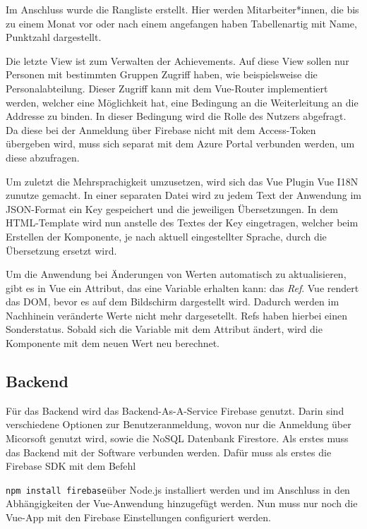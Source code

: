 \documentclass[12pt]{article}
\begin{document}
Im Anschluss wurde die Rangliste erstellt. Hier werden Mitarbeiter*innen, die bis zu einem Monat vor oder
nach einem angefangen haben Tabellenartig mit Name, Punktzahl dargestellt. %

Die letzte View ist zum Verwalten der Achievements. Auf diese View sollen nur Personen
mit bestimmten Gruppen Zugriff haben, wie beispielsweise die Personalabteilung. Dieser Zugriff
kann mit dem Vue-Router implementiert werden, welcher eine Möglichkeit hat, eine Bedingung
an die Weiterleitung an die Addresse zu binden. In dieser Bedingung wird die Rolle des
Nutzers abgefragt. Da diese bei der Anmeldung über Firebase nicht mit dem Access-Token
übergeben wird, muss sich separat mit dem Azure Portal verbunden werden, um diese abzufragen.

Um zuletzt die Mehrsprachigkeit umzusetzen, wird sich das Vue Plugin Vue I18N zunutze gemacht.
In einer separaten Datei wird zu jedem Text der Anwendung im JSON-Format ein Key gespeichert und
die jeweiligen Übersetzungen. In dem HTML-Template wird nun anstelle des Textes der Key eingetragen,
welcher beim Erstellen der Komponente, je nach aktuell eingestellter Sprache, durch die Übersetzung
ersetzt wird.

Um die Anwendung bei Änderungen von Werten automatisch zu aktualisieren, gibt es in Vue ein Attribut, das eine
Variable erhalten kann: das \textit{Ref}. Vue rendert das DOM, bevor es auf dem Bildschirm dargestellt wird.
Dadurch werden im Nachhinein veränderte Werte nicht mehr dargesetellt. Refs haben hierbei einen Sonderstatus.
Sobald sich die Variable mit dem Attribut ändert, wird die Komponente mit dem neuen Wert neu berechnet.



\subsection{Backend}

Für das Backend wird das Backend-As-A-Service Firebase genutzt. Darin sind verschiedene Optionen zur Benutzeranmeldung, 
wovon nur die Anmeldung über Micorsoft genutzt wird, sowie die NoSQL Datenbank Firestore. 
Als erstes muss das Backend mit der Software verbunden werden. Dafür muss als erstes die Firebase SDK mit dem Befehl

\texttt{npm install firebase}\newline über Node.js installiert werden und im Anschluss in den
Abhängigkeiten der Vue-Anwendung hinzugefügt werden.
Nun muss nur noch die Vue-App mit den Firebase Einstellungen configuriert werden.
\end{document}
